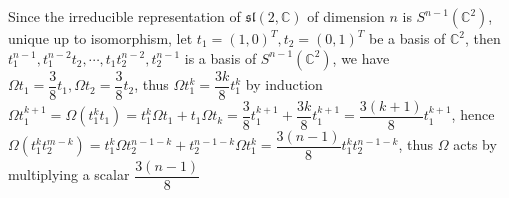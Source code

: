 \documentclass[main]{subfiles}
\begin{document}
Since the irreducible representation of $\mathfrak{sl}(2,\mathbb C)$ of dimension $n$ is $S^{n-1}(\mathbb C^2)$, unique up to isomorphism, let $t_1=(1,0)^T,t_2=(0,1)^T$ be a basis of $\mathbb C^2$, then $t_1^{n-1},t_1^{n-2}t_2,\cdots,t_1t_2^{n-2},t_2^{n-1}$ is a basis of $S^{n-1}(\mathbb C^2)$, we have $\Omega t_1=\dfrac{3}{8}t_1,\Omega t_2=\dfrac{3}{8}t_2$, thus $\Omega t_1^k=\dfrac{3k}{8}t_1^{k}$ by induction $\Omega t_1^{k+1}=\Omega\left(t_1^kt_1\right)=t_1^k\Omega t_1+t_1\Omega t_k=\dfrac{3}{8}t_1^{k+1}+\dfrac{3k}{8}t_1^{k+1}=\dfrac{3(k+1)}{8}t_1^{k+1}$, hence $\Omega(t_1^kt_2^{m-k})=t_1^k\Omega t_2^{n-1-k}+t_2^{n-1-k}\Omega t_1^k=\dfrac{3(n-1)}{8}t_1^kt_2^{n-1-k}$, thus $\Omega$ acts by multiplying a scalar $\dfrac{3(n-1)}{8}$ \\

\begin{exercise}
\begin{enumerate}[label=(\alph*),leftmargin=*]

\end{enumerate}
\end{exercise}
\end{document}
